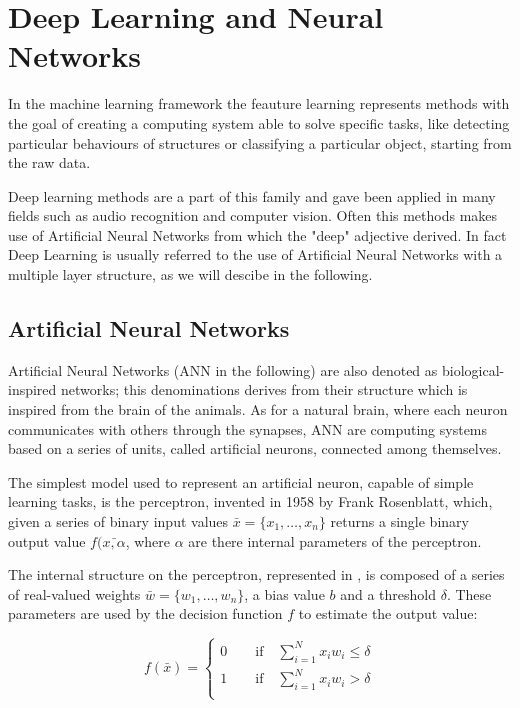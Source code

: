 \chapter{Deep Learning and Neural Networks}

In the machine learning framework the feauture learning represents methods with the goal of creating a computing system able to solve specific tasks, like detecting particular behaviours of structures or classifying a particular object, starting from the raw data.

Deep learning methods are a part of this family and gave been applied in many fields such as audio recognition and computer vision. Often this methods makes use of Artificial Neural Networks from which the "deep" adjective derived. In fact Deep Learning is usually referred to the use of Artificial Neural Networks with a multiple layer structure, as we will descibe in the following.

\section{Artificial Neural Networks}

Artificial Neural Networks (ANN in the following) are also denoted as biological-inspired networks; this denominations derives from their structure which is inspired from  the brain of the animals. As for a natural brain, where each neuron communicates with others through the synapses, ANN are computing systems based on a series of units, called artificial neurons, connected among themselves. 

The simplest model used to represent an artificial neuron, capable of simple learning tasks, is the perceptron, invented in 1958 by Frank Rosenblatt, which, given a series of binary input values $\bar{x}=\{x_1,\dots, x_n\}$ returns a single binary output value $f(\bar{x, \alpha}$, where $\alpha$ are there internal parameters of the perceptron. 

The internal structure on the perceptron, represented in , is composed of a series of real-valued weights $\bar{w}=\{w_1,\dots,w_n\}$, a bias value $b$ and a threshold $\delta$. These parameters are used by the decision function $f$ to estimate the output value:

\begin{equation}
f(\bar{x}) = 
\begin{cases}
0\qquad\text{if}\quad\sum_{i=1}^N x_iw_i \leq \delta \\
1\qquad\text{if}\quad\sum_{i=1}^N x_iw_i > \delta \\
\end{cases}
\end{equation}

